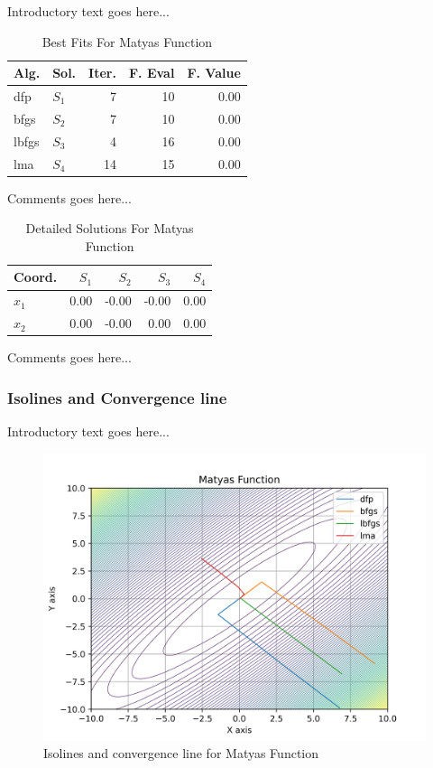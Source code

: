 \documentclass{ieeeaccess}
\begin{document}
Introductory text goes here...
\begin{table}
\centering
\caption{Best Fits For Matyas Function}
\label{solutions:matyas}
\begin{tabular}{llrrr}
\toprule
 Alg. &    Sol. &  Iter. &  F. Eval &  F. Value \\
\midrule
  dfp & $S_{1}$ &      7 &       10 &      0.00 \\
 bfgs & $S_{2}$ &      7 &       10 &      0.00 \\
lbfgs & $S_{3}$ &      4 &       16 &      0.00 \\
  lma & $S_{4}$ &     14 &       15 &      0.00 \\
\bottomrule
\end{tabular}
\end{table}


Comments goes here...
\begin{table}
\centering
\caption{Detailed Solutions For Matyas Function}
\label{detailedsolutions:matyas}
\begin{tabular}{lrrrr}
\toprule
 Coord. &  $S_{1}$ &  $S_{2}$ &  $S_{3}$ &  $S_{4}$ \\
\midrule
$x_{1}$ &     0.00 &    -0.00 &    -0.00 &     0.00 \\
$x_{2}$ &     0.00 &    -0.00 &     0.00 &     0.00 \\
\bottomrule
\end{tabular}
\end{table}


Comments goes here...
\subsubsection{Isolines and Convergence line}
\label{isolinesmatyas2D}


Introductory text goes here...
\begin{figure}[h]
\centering
\includegraphics[scale=0.5]{images/matyas.jpg}
\caption{Isolines and convergence line for Matyas Function}
\label{fig:matyas}
\end{figure}
\end{document}
